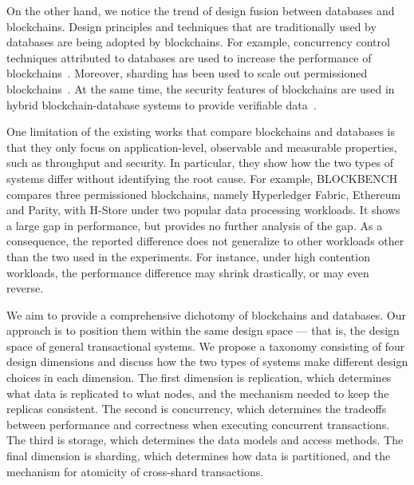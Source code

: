 On the other hand, we notice the trend of design fusion between databases and blockchains. Design principles and techniques that are traditionally used by databases are being adopted by blockchains. For example, concurrency control techniques attributed to databases are used to increase the performance of blockchains~\cite{sharma2019blurring, ruan2020transactional, dickerson2017adding}. Moreover, sharding has been used to scale out permissioned blockchains~\cite{dang2019towards}. At the same time, the security features of blockchains are used in hybrid blockchain-database systems to provide verifiable data~\cite{el2019blockchaindb, veritas, peng2020falcondb}. 

One limitation of the existing works that compare blockchains and databases is that they only focus on
application-level, observable and measurable properties, such as throughput and security. In particular, they
show how the two types of systems differ without identifying the root cause. For example, 
BLOCKBENCH~\cite{dinh2017blockbench} compares three permissioned blockchains, namely Hyperledger Fabric, Ethereum
and Parity, with H-Store under two popular data processing workloads. It shows a large gap in performance, but provides no further analysis of the gap. As a consequence, the reported difference does not
generalize to other workloads other than the two used in the experiments. For instance, under high contention
workloads, the performance difference may shrink drastically, or may even reverse.   

We aim to provide a comprehensive dichotomy of blockchains and databases. Our approach is to position  
them within the same design space --- that is, the design space of general transactional systems. We propose a
taxonomy consisting of four design dimensions and discuss how the two types of systems make different design choices in
each dimension. The first dimension is replication, which determines what data is replicated to what nodes,
and the mechanism needed to keep the replicas consistent. The second is concurrency, which determines the tradeoffs between performance and correctness when executing concurrent transactions. The third is storage, which
determines the data models and access methods. The final dimension is sharding, which determines how data is
partitioned, and the mechanism for atomicity of cross-shard transactions.  

